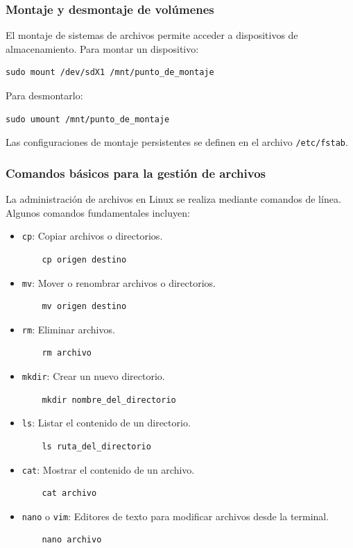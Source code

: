 \subsubsection{Montaje y desmontaje de volúmenes}

El montaje de sistemas de archivos permite acceder a dispositivos de almacenamiento. Para montar un dispositivo:

\begin{lstlisting}
sudo mount /dev/sdX1 /mnt/punto_de_montaje
\end{lstlisting}

Para desmontarlo:

\begin{lstlisting}
sudo umount /mnt/punto_de_montaje
\end{lstlisting}

Las configuraciones de montaje persistentes se definen en el archivo \texttt{/etc/fstab}.

\subsubsection{Comandos básicos para la gestión de archivos}

La administración de archivos en Linux se realiza mediante comandos de línea. Algunos comandos fundamentales incluyen:

\begin{itemize}
  \item \texttt{cp}: Copiar archivos o directorios.
    \begin{lstlisting}
    cp origen destino
    \end{lstlisting}
  \item \texttt{mv}: Mover o renombrar archivos o directorios.
    \begin{lstlisting}
    mv origen destino
    \end{lstlisting}
  \item \texttt{rm}: Eliminar archivos.
    \begin{lstlisting}
    rm archivo
    \end{lstlisting}
  \item \texttt{mkdir}: Crear un nuevo directorio.
    \begin{lstlisting}
    mkdir nombre_del_directorio
    \end{lstlisting}
  \item \texttt{ls}: Listar el contenido de un directorio.
    \begin{lstlisting}
    ls ruta_del_directorio
    \end{lstlisting}
  \item \texttt{cat}: Mostrar el contenido de un archivo.
    \begin{lstlisting}
    cat archivo
    \end{lstlisting}
  \item \texttt{nano} o \texttt{vim}: Editores de texto para modificar archivos desde la terminal.
    \begin{lstlisting}
    nano archivo
    \end{lstlisting}
\end{itemize}

